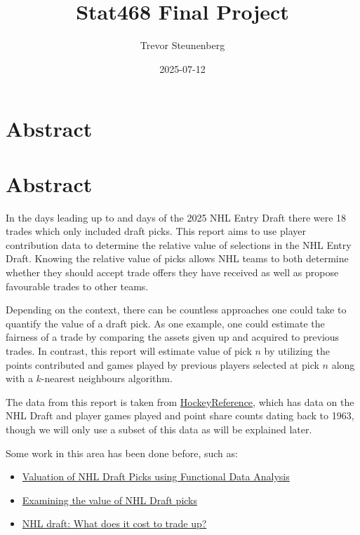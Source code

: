 \documentclass[
  letterpaper,
  DIV=11,
  numbers=noendperiod]{scrreprt}
\title{Stat468 Final Project}
\author{Trevor Steunenberg}
\date{2025-07-12}
\renewcommand*\contentsname{Table of contents}
\newcommand\contentsname{Table of contents}
\begin{document}
\maketitle

\renewcommand*\contentsname{Table of contents}
{
\hypersetup{linkcolor=}
\setcounter{tocdepth}{2}
\tableofcontents
}

\chapter{Abstract}\label{abstract}


\chapter{Abstract}\label{abstract-1}

In the days leading up to and days of the 2025 NHL Entry Draft there
were 18 trades which only included draft picks. This report aims to use
player contribution data to determine the relative value of selections
in the NHL Entry Draft. Knowing the relative value of picks allows NHL
teams to both determine whether they should accept trade offers they
have received as well as propose favourable trades to other teams.

Depending on the context, there can be countless approaches one could
take to quantify the value of a draft pick. As one example, one could
estimate the fairness of a trade by comparing the assets given up and
acquired to previous trades. In contrast, this report will estimate
value of pick \(n\) by utilizing the points contributed and games played
by previous players selected at pick \(n\) along with a \(k\)-nearest
neighbours algorithm.

The data from this report is taken from
\href{https://www.hockey-reference.com/draft/}{HockeyReference}, which
has data on the NHL Draft and player games played and point share counts
dating back to 1963, though we will only use a subset of this data as
will be explained later.

Some work in this area has been done before, such as:

\begin{itemize}
\item
  \href{https://summit.sfu.ca/_flysystem/fedora/2023-02/etd22223.pdf}{Valuation
  of NHL Draft Picks using Functional Data Analysis}
\item
  \href{https://soundofhockey.com/2022/06/06/examining-the-value-of-nhl-draft-picks/amp/}{Examining
  the value of NHL Draft picks}
\item
  \href{https://www.broadstreethockey.com/post/nhl-draft-pick-value-trading-up/}{NHL
  draft: What does it cost to trade up?}
\end{itemize}
\end{document}
